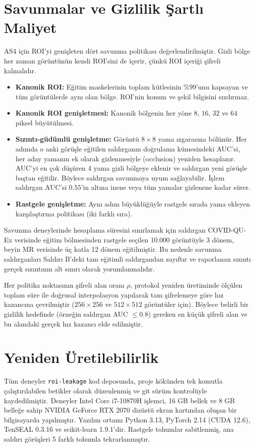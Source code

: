\section{Savunmalar ve Gizlilik Şartlı Maliyet}\label{sec:defense}

AS4 için ROI'yi genişleten dört savunma politikası değerlendirilmiştir. Gizli bölge her zaman görüntünün kendi ROI'sini de içerir, çünkü ROI içeriği şifreli kalmalıdır.

\begin{itemize}
\item \textbf{Kanonik ROI:} Eğitim maskelerinin toplam kütlesinin \%99'unu kapsayan ve tüm görüntülerde aynı olan bölge. ROI'nin konum ve şekil bilgisini sızdırmaz.
\item \textbf{Kanonik ROI genişletmesi:} Kanonik bölgenin her yöne $8$, $16$, $32$ ve $64$ piksel büyütülmesi.
\item \textbf{Sızıntı-güdümlü genişletme:} Görüntü $8 \times 8$ yama ızgarasına bölünür. Her adımda o anki görüşle eğitilen saldırganın doğrulama kümesindeki AUC'si, her aday yamanın ek olarak gizlenmesiyle (occlusion) yeniden hesaplanır. AUC'yi en çok düşüren 4 yama gizli bölgeye eklenir ve saldırgan yeni görüşle baştan eğitilir. Böylece saldırgan savunmaya uyum sağlayabilir. İşlem saldırgan AUC'si $0.55$'in altına inene veya tüm yamalar gizlenene kadar sürer.
\item \textbf{Rastgele genişletme:} Aynı adım büyüklüğüyle rastgele sırada yama ekleyen karşılaştırma politikası (iki farklı sıra).
\end{itemize}

Savunma deneylerinde hesaplama süresini sınırlamak için saldırgan COVID-QU-Ex verisinde eğitim bölmesinden rastgele seçilen 10.000 görüntüyle 3 dönem, beyin MR verisinde üç katla 12 dönem eğitilmiştir. Bu nedenle savunma saldırganları Saldırı B'deki tam eğitimli saldırgandan zayıftır ve raporlanan sızıntı gerçek sızıntının alt sınırı olarak yorumlanmalıdır.

Her politika noktasının şifreli alan oranı $\rho$, protokol yeniden üretiminde ölçülen toplam süre ile doğrusal interpolasyon yapılarak tam şifrelemeye göre hız kazancına çevrilmiştir ($256 \times 256$ ve $512 \times 512$ görüntüler için). Böylece belirli bir gizlilik hedefinde (örneğin saldırgan AUC $\leq 0.8$) gereken en küçük şifreli alan ve bu alandaki gerçek hız kazancı elde edilmiştir.

\section{Yeniden Üretilebilirlik}\label{sec:repro}

Tüm deneyler \texttt{roi-leakage} kod deposunda, proje kökünden tek komutla çalıştırılabilen betikler olarak düzenlenmiş ve git sürüm kontrolüyle kaydedilmiştir. Deneyler Intel Core i7-10870H işlemci, 16 GB bellek ve 8 GB belleğe sahip NVIDIA GeForce RTX 2070 dizüstü ekran kartından oluşan bir bilgisayarda yapılmıştır. Yazılım ortamı Python 3.13, PyTorch 2.14 (CUDA 12.6), TenSEAL 0.3.16 ve scikit-learn 1.9.1'dir. Rastgele tohumlar sabitlenmiş, ana saldırı görüşleri 5 farklı tohumla tekrarlanmıştır.
